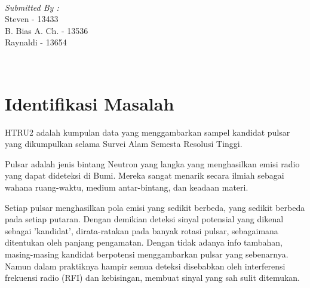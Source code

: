 \documentclass[12pt]{article}
\begin{document}
\begin{titlepage}
	\begin{minipage}{0.4\textwidth}
		\begin{flushleft} \large
			\end{flushleft}
			\end{minipage}~
			\begin{minipage}{0.4\textwidth}
            
			\begin{flushright} \large
			\emph{Submitted By :} \\[0.5 cm]
			Steven - 13433\\
			B. Bias A. Ch. - 13536\\
			Raynaldi - 13654\\
		\end{flushright}
        
	\end{minipage}\\[2 cm]
	
	
    
    
    
    
	
\end{titlepage}


\tableofcontents
\pagebreak


\section{Identifikasi Masalah}

HTRU2 adalah kumpulan data yang menggambarkan sampel kandidat pulsar yang dikumpulkan selama Survei Alam Semesta Resolusi Tinggi. \cite{datasets}

Pulsar adalah jenis bintang Neutron yang langka yang menghasilkan emisi radio yang dapat dideteksi di Bumi. Mereka sangat menarik secara ilmiah sebagai wahana ruang-waktu, medium antar-bintang, dan keadaan materi.

Setiap pulsar menghasilkan pola emisi yang sedikit berbeda, yang sedikit berbeda pada setiap putaran. Dengan demikian deteksi sinyal potensial yang dikenal sebagai 'kandidat', dirata-ratakan pada banyak rotasi pulsar, sebagaimana ditentukan oleh panjang pengamatan. Dengan tidak adanya info tambahan, masing-masing kandidat berpotensi menggambarkan pulsar yang sebenarnya. Namun dalam praktiknya hampir semua deteksi disebabkan oleh interferensi frekuensi radio (RFI) dan kebisingan, membuat sinyal yang sah sulit ditemukan.
\end{document}
